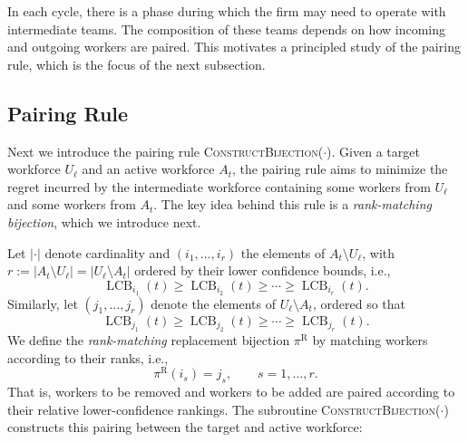 \documentclass[opre,blindrev]{informs3}
\newcommand{\LCB}{\operatorname{LCB}}
\newcommand{\ConstructBijection}{\textsc{ConstructBijection}}
\begin{document}
In each cycle, there is a phase during which the firm may need to operate with intermediate teams. The composition of these teams depends on how incoming and outgoing workers are paired. This motivates a principled study of the pairing rule, which is the focus of the next subsection.

\vspace{-.1in}
\subsection{Pairing Rule}
Next we introduce the pairing rule \ConstructBijection(\(\cdot\)). Given a target workforce \(U_{\ell}\) and an active workforce \(A_t\), the pairing rule aims to minimize the regret incurred by the intermediate workforce containing some workers from \(U_{\ell}\) and some workers from \(A_t\). The key idea behind this rule is a \emph{rank-matching bijection}, which we introduce next.

Let \(|\cdot|\) denote cardinality and \((i_1,\dots,i_r)\) the elements of \(A_{t}\setminus U_\ell\), with \(r := |A_{t}\setminus U_\ell| = |U_\ell\setminus A_{t}|\) ordered by their lower confidence bounds, i.e., 
\[
\LCB_{i_1}(t) \ge \LCB_{i_2}(t) \ge \cdots \ge \LCB_{i_r}(t).
\]
Similarly, let \((j_1,\dots,j_r)\) denote the elements of \(U_\ell\setminus A_{t}\), ordered so that
\[
\LCB_{j_1}(t) \ge \LCB_{j_2}(t) \ge \cdots \ge \LCB_{j_r}(t).
\]
We define the \emph{rank-matching} replacement bijection \(\pi^{\mathrm R}\) by matching workers according to their ranks, i.e., 
\begin{equation}\label{eq:rm-bijection}
    \pi^{\mathrm R}(i_s) = j_s, \qquad s=1,\dots,r.
\end{equation}
That is, workers to be removed and workers to be added are paired according to their relative lower-confidence rankings. The subroutine \ConstructBijection(\(\cdot\)) constructs this pairing between the target and active workforce:
\end{document}
